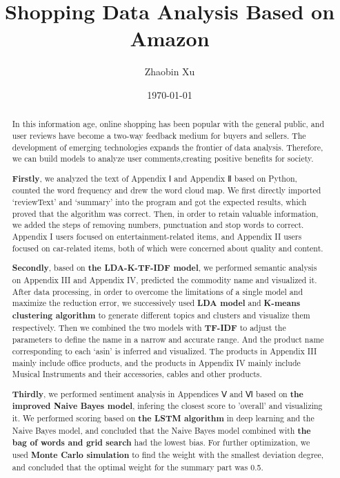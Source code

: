 \documentclass[12pt]{mcmthesis}
\title{Shopping Data Analysis Based on Amazon}
\author{\small Zhaobin Xu}
\date{\today}
\begin{document}
\thispagestyle{empty}
\begin{abstract}
\par In this information age, online shopping has been popular with the general public, and user reviews have become a two-way feedback medium for buyers and sellers. The development of emerging technologies expands the frontier of data analysis. Therefore, we can build models to analyze user comments,creating positive benefits for society.

\textbf{Firstly}, we analyzed the text of Appendix Ⅰ and Appendix Ⅱ based on Python, counted the word frequency and drew the word cloud map. We first directly imported ‘reviewText’ and ‘summary’ into the program and got the expected results, which proved that the algorithm was correct. Then, in order to retain valuable information, we added the steps of removing numbers, punctuation and stop words to correct. Appendix I users focused on entertainment-related items, and Appendix II users focused on car-related items, both of which were concerned about quality and content.

\textbf{Secondly}, based on \textbf{the LDA-K-TF-IDF model}, we performed semantic analysis on Appendix III and Appendix IV, predicted the commodity name and visualized it. After data processing, in order to overcome the limitations of a single model and maximize the reduction error, we successively used \textbf{LDA model} and \textbf{K-means clustering algorithm} to generate different topics and clusters and visualize them respectively. Then we combined the two models with \textbf{TF-IDF} to adjust the parameters to define the name in a narrow and accurate range. And the product name corresponding to each ‘asin’ is inferred and visualized. The products in Appendix III mainly include office products, and the products in Appendix IV mainly include Musical Instruments and their accessories, cables and other products.

\textbf{Thirdly}, we performed sentiment analysis in Appendices Ⅴ and Ⅵ based on\textbf{ the improved Naive Bayes model}, infering the closest score to 'overall' and visualizing it. We performed scoring based on \textbf{the LSTM algorithm} in deep learning and the Naive Bayes model, and concluded that the Naive Bayes model combined with \textbf{the bag of words and grid search} had the lowest bias. For further optimization, we used \textbf{Monte Carlo simulation} to find the weight with the smallest deviation degree, and concluded that the optimal weight for the summary part was 0.5.


\end{abstract}
\end{document}
